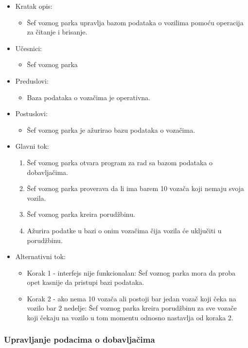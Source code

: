 \begin{itemize}
	\item Kratak opis:
		\begin{itemize}
			\item Šef voznog parka upravlja bazom podataka o vozilima pomoću operacija za čitanje i brisanje.
		\end{itemize}
	\item Učesnici:
		\begin{itemize}
		    \item Šef voznog parka
		\end{itemize}
	\item Preduslovi:
		\begin{itemize}
		    \item Baza podataka o vozačima je operativna.
		\end{itemize}
	\item Postuslovi:
		\begin{itemize}
			\item Šef voznog parka je ažurirao bazu podataka o vozačima.
	\end{itemize}
	\item Glavni tok:
		\begin{enumerate}
		    \item Šef voznog parka otvara program za rad sa bazom podataka o dobavljačima.
		    \item Šef voznog parka proverava da li ima barem 10 vozača koji nemaju svoja vozila.
		    \item Šef voznog parka kreira porudžbinu.
			\item Ažurira podatke u bazi o onim vozačima čija vozila će uključiti u porudžbinu.
		\end{enumerate}
	\item Alternativni tok:
		\begin{itemize}
		    \item Korak 1 - interfejs nije funkcionalan: Šef voznog parka mora da proba opet kasnije da pristupi bazi podataka.
			\item Korak 2 - ako nema 10 vozača ali postoji bar jedan vozač koji čeka na vozilo bar 2 nedelje: Šef voznog parka kreira porudžbinu za sve vozače koji čekaju na vozilo u tom momentu odnosno nastavlja od koraka 2.
		\end{itemize}
\end{itemize}


\subsubsection{\bfseries Upravljanje podacima o dobavljačima}

